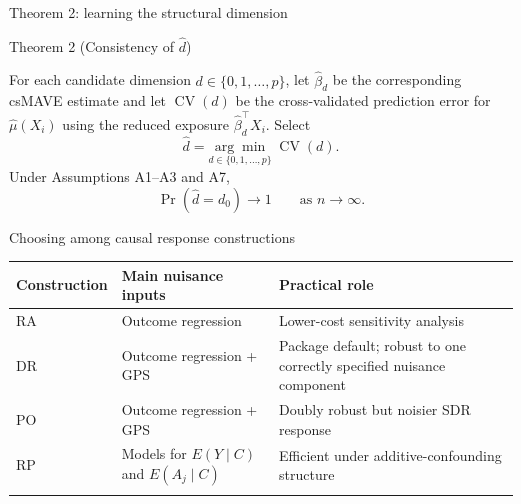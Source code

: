 \documentclass[
  ignorenonframetext,
  aspectratio=169,
  11pt]{beamer}
\begin{document}
\begin{frame}{Theorem 2: learning the structural dimension}
\label{theorem-2-learning-the-structural-dimension}
\vspace{-0.16cm}

\begin{block}{Theorem 2 (Consistency of \(\widehat d\))}
\begin{minipage}[t][3.85cm][t]{\linewidth}
\small
For each candidate dimension \(d\in\{0,1,\ldots,p\}\), let
\(\widehat\beta_d\) be the corresponding csMAVE estimate and let
\(\operatorname{CV}(d)\) be the cross-validated prediction error for
\(\widehat\mu(X_i)\) using the reduced exposure
\(\widehat\beta_d^\top X_i\). Select
\[
\widehat d
=
\underset{d\in\{0,1,\ldots,p\}}{\arg\min}\;
\operatorname{CV}(d).
\]
Under Assumptions A1--A3 and A7,
\[
\boxed{\qquad
\Pr(\widehat d=d_0)\longrightarrow1
\qquad\text{as }n\to\infty .
\qquad}
\]
\end{minipage}
\end{block}
\end{frame}

\begin{frame}{Choosing among causal response constructions}
\label{choosing-among-causal-response-constructions}
\small

\begin{longtable}[]{@{}
  >{\raggedright\arraybackslash}p{}
  >{\raggedright\arraybackslash}p{}
  >{\raggedright\arraybackslash}p{}@{}}
\toprule\noalign{}
\begin{minipage}[b]{\linewidth}\raggedright
Construction
\end{minipage} & \begin{minipage}[b]{\linewidth}\raggedright
Main nuisance inputs
\end{minipage} & \begin{minipage}[b]{\linewidth}\raggedright
Practical role
\end{minipage} \\
\midrule\noalign{}
\endhead
RA & Outcome regression & Lower-cost sensitivity analysis \\
DR & Outcome regression + GPS & Package default; robust to one correctly
specified nuisance component \\
PO & Outcome regression + GPS & Doubly robust but noisier SDR
response \\
RP & Models for \(E(Y\mid C)\) and \(E(A_j\mid C)\) & Efficient under
additive-confounding structure \\
\bottomrule\noalign{}
\end{longtable}

\normalsize
\end{frame}
\end{document}
